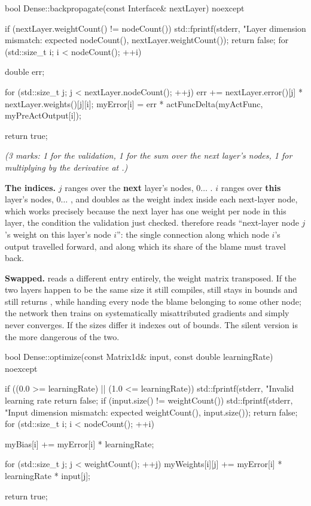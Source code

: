 \begin{cppcode}
bool Dense::backpropagate(const Interface& nextLayer) noexcept
{
    if (nextLayer.weightCount() != nodeCount())
    {
        std::fprintf(stderr, "Layer dimension mismatch: expected %
            nodeCount(), nextLayer.weightCount());
        return false;
    }
    for (std::size_t i{}; i < nodeCount(); ++i)
    {
        double err{};

        for (std::size_t j{}; j < nextLayer.nodeCount(); ++j)
        {
            err += nextLayer.error()[j] * nextLayer.weights()[j][i];
        }
        myError[i] = err * actFuncDelta(myActFunc, myPreActOutput[i]);
    }
    return true;
}
\end{cppcode}

\noindent\textit{(3 marks: 1 for the validation, 1 for the sum over the next layer's nodes, 1 for
multiplying by the derivative at .)}

\textbf{The indices.} $j$ ranges over the \textbf{next} layer's nodes, $0 \ldots$
. $i$ ranges over \textbf{this} layer's nodes, $0 \ldots$
, and doubles as the weight index inside each next-layer node, which works
precisely because the next layer has one weight per node in this layer, the condition the validation
just checked.  therefore reads ``next-layer node $j$'s weight on this layer's
node $i$'': the single connection along which node $i$'s output travelled forward, and along which
its share of the blame must travel back.

\textbf{Swapped.}  reads a different entry entirely, the weight matrix
transposed. If the two layers happen to be the same size it still compiles, still stays in bounds and
still returns , while handing every node the blame belonging to some other node; the
network then trains on systematically misattributed gradients and simply never converges. If the
sizes differ it indexes out of bounds. The silent version is the more dangerous of the two.

\begin{cppcode}
bool Dense::optimize(const Matrix1d& input, const double learningRate) noexcept
{
    if ((0.0 >= learningRate) || (1.0 <= learningRate))
    {
        std::fprintf(stderr, "Invalid learning rate %
        return false;
    }
    if (input.size() != weightCount())
    {
        std::fprintf(stderr, "Input dimension mismatch: expected %
            weightCount(), input.size());
        return false;
    }
    for (std::size_t i{}; i < nodeCount(); ++i)
    {
        myBias[i] += myError[i] * learningRate;

        for (std::size_t j{}; j < weightCount(); ++j)
        {
            myWeights[i][j] += myError[i] * learningRate * input[j];
        }
    }
    return true;
}
\end{cppcode}

